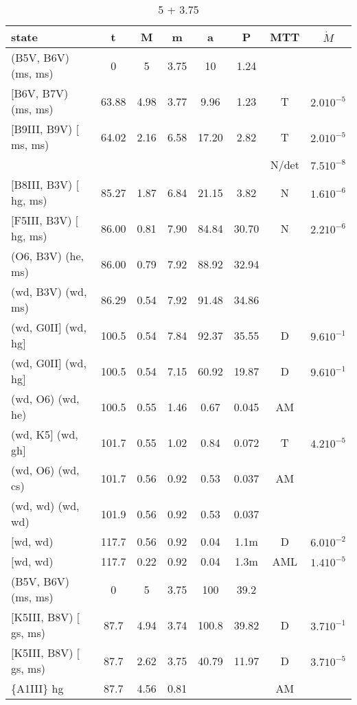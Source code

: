 \documentclass{article}
\begin{document}
\begin{table}
\caption{ 5 + 3.75}
\begin{tabular}{p{4cm}ccccccc}
\hline
state 		    	& t 	& M	& m	& a	& P	& MTT	&$\dot{M}$		\\ \hline 
(B5V, B6V) (ms, ms)	& 0	& 5	& 3.75	& 10	& 1.24	&       &			\\
$[$B6V, B7V) (ms, ms)	& 63.88	& 4.98	& 3.77	& 9.96	& 1.23	& T     & $2.0 10^{-5}$		\\
$[$B9III, B9V) $[$ms, ms)	& 64.02	& 2.16	& 6.58	& 17.20	& 2.82	& T     & $2.0 10^{-5}$		\\
			&	& 	&	&	&	& N/det	& $7.5 10^{-8}$		\\
$[$B8III, B3V) $[$hg, ms)	& 85.27	& 1.87	& 6.84	& 21.15	& 3.82	& N     & $1.6 10^{-6}$		\\
$[$F5III, B3V) $[$hg, ms)	& 86.00	& 0.81	& 7.90	& 84.84	& 30.70	& N     & $2.2 10^{-6}$		\\
(O6, B3V) (he, ms)	& 86.00	& 0.79	& 7.92	& 88.92	& 32.94	&       &                	\\
(wd, B3V) (wd, ms)	& 86.29	& 0.54	& 7.92	& 91.48	& 34.86	&       &                	\\
(wd, G0II$]$ (wd, hg$]$	& 100.5	& 0.54	& 7.84	& 92.37	& 35.55	& D     & $9.6 10^{-1}$		\\
(wd, G0II$]$ (wd, hg$]$	& 100.5	& 0.54	& 7.15	& 60.92	& 19.87	& D     & $9.6 10^{-1}$		\\
(wd, O6) (wd, he)	& 100.5	& 0.55	& 1.46	& 0.67 	& 0.045	& AM    &              		\\
(wd, K5$]$ (wd, gh$]$	& 101.7	& 0.55	& 1.02	& 0.84 	& 0.072	& T     & $4.2 10^{-5}$		\\
(wd, O6) (wd, cs)	& 101.7	& 0.56	& 0.92	& 0.53 	& 0.037	& AM    &               	\\
(wd, wd) (wd, wd)	& 101.9	& 0.56	& 0.92	& 0.53 	& 0.037	&       &               	\\
$[$wd, wd)         	& 117.7	& 0.56	& 0.92	& 0.04 	& 1.1m 	& D     & $6.0 10^{-2}$		\\
$[$wd, wd)         	& 117.7	& 0.22	& 0.92	& 0.04 	& 1.3m 	& AML   & $1.4 10^{-5}$		\\
\hline
(B5V, B6V) (ms, ms)	& 0	& 5	& 3.75	& 100	& 39.2	&       &			\\
$[$K5III, B8V) $[$gs, ms)	& 87.7 	& 4.94	& 3.74	& 100.8	& 39.82	& D     & $3.7 10^{-1}$		\\
$[$K5III, B8V) $[$gs, ms)	& 87.7 	& 2.62	& 3.75	& 40.79	& 11.97	& D     & $3.7 10^{-5}$		\\
\{A1III\}    hg      	& 87.7 	& 4.56	& 0.81	&      	&      	& AM    &               	\\

\end{tabular}
\end{table}
\end{document}
